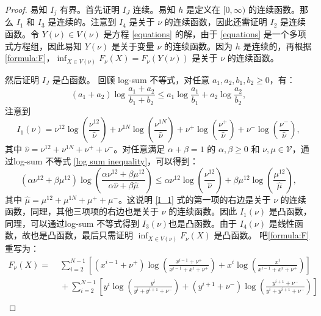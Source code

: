 \begin{proof}
	易知 $I_j$ 有界。首先证明 $I_J$ 连续。易知 $h$ 是定义在 $[0,\infty)$ 的连续函数。那么 $I_1$ 和 $I_3$ 是连续的。注意到  $I_4$ 是关于 $\nu$ 的连续函数，因此还需证明 $I_2$ 是连续函数。令 $Y(\nu)\in V(\nu)$ 是方程 \eqref{equations} 的解，由于 \eqref{equations} 是一个多项式方程组，因此易知 $Y(\nu)$ 是关于变量 $\nu$ 的连续函数。因为 $h$ 是连续的，再根据 \eqref{formula:F}，$\inf_{X\in V(\nu)}F_{\nu}(X)=F_{\nu}(Y(\nu))$ 是关于 $\nu$ 的连续函数。
	
	然后证明 $I_J$ 是凸函数。 回顾 log-sum 不等式，对任意 $a_{1},a_{2},b_{1},b_{2}\ge 0$，有：
	\begin{equation}\label{log sum inequality}
		(a_1+a_2)\log \frac{a_1+a_2}{b_1+b_2}\le a_{1}\log \frac{a_{1}}{b_{1}}+a_{2}\log \frac{a_{2}}{b_{2}} ,
	\end{equation}
	注意到
	\begin{equation}\label{I_1}
		I_1(\nu) = \nu^{12}\log\left(\frac{\nu^{12}}{\hat{\nu}}\right)+\nu^{1N}\log\left(\frac{\nu^{1N}}{\hat{\nu}}\right)+\nu^{+}\log\left(\frac{\nu^{+}}{\hat{\nu}}\right)+\nu^{-}\log\left(\frac{\nu^{-}}{\hat{\nu}}\right),
	\end{equation}
	其中 $\hat{\nu}=\nu^{12}+\nu^{1N}+\nu^++\nu^-$。对任意满足 $\alpha+\beta=1$ 的 $\alpha,\beta\ge 0$ 和 $\nu,\mu\in \mathcal{V}$，通过log-sum 不等式 \eqref{log sum inequality}，可以得到：
	\begin{equation*}
		(\alpha \nu^{12}+\beta \mu^{12})\log\left(\frac{\alpha \nu^{12}+\beta \mu^{12}}{\alpha \hat{\nu}+\beta \hat{\mu}}\right)\le \alpha\nu^{12}\log\left(\frac{\nu^{12}}{\hat{\nu}}\right)+\beta\mu^{12}\log\left(\frac{\mu^{12}}{\hat{\mu}}\right),
	\end{equation*}
	其中 $\hat{\mu}=\mu^{12}+\mu^{1N}+\mu^++\mu^-$。这说明 \eqref{I_1} 式的第一项的右边是关于 $\nu$ 的连续函数，同理，其他三项项的右边也是关于 $\nu$ 的连续函数。因此 $I_1(\nu)$ 是凸函数，同理，可以通过log-sum 不等式得到 $I_3(\nu)$也是凸函数。由于 $I_4(\nu)$ 是线性函数，故也是凸函数，最后只需证明 $\inf_{X\in V(\nu)}F_{\nu}(X)$ 是凸函数。 吧\eqref{formula:F} 重写为：
	\begin{align*}
		F_{\nu}(X)=&\;\sum_{i=2}^{N-1}\left[(x^{i-1}+\nu^+)\log\left(\frac{x^{i-1}+\nu^+}{x^{i-1}+x^i+\nu^+}\right)+x^i\log\left(\frac{x^{i}}{x^{i-1}+x^i+\nu^+}\right)\right]\\
		&\;+\sum_{i=2}^{N-1}\left[y^i\log\left(\frac{y^{i}}{y^{i}+y^{i+1}+\nu^-}\right)+(y^{i+1}+\nu^-)\log\left(\frac{y^{i+1}+\nu^-}{y^{i}+y^{i+1}+\nu^-}\right)\right]\\

\end{align*}
\end{proof}
